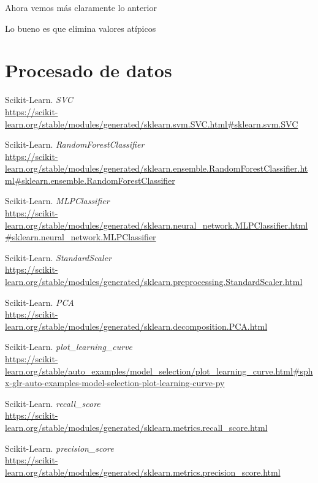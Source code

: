 \documentclass[11pt,a4paper]{article}
\begin{document}
Ahora vemos más claramente lo anterior

Lo bueno es que elimina valores atípicos


\section{Procesado de datos}




\newpage

\begin{thebibliography}{}
    
    Scikit-Learn. \textit{SVC}
    \\\url{https://scikit-learn.org/stable/modules/generated/sklearn.svm.SVC.html#sklearn.svm.SVC}
    
    Scikit-Learn. \textit{RandomForestClassifier}
    \\\url{https://scikit-learn.org/stable/modules/generated/sklearn.ensemble.RandomForestClassifier.html#sklearn.ensemble.RandomForestClassifier}
    
    Scikit-Learn. \textit{MLPClassifier}
    \\\url{https://scikit-learn.org/stable/modules/generated/sklearn.neural_network.MLPClassifier.html#sklearn.neural_network.MLPClassifier}
    
    Scikit-Learn. \textit{StandardScaler}
    \\\url{https://scikit-learn.org/stable/modules/generated/sklearn.preprocessing.StandardScaler.html}
    
    Scikit-Learn. \textit{PCA}
    \\\url{https://scikit-learn.org/stable/modules/generated/sklearn.decomposition.PCA.html}
    
    Scikit-Learn. \textit{plot\_learning\_curve}
    \\\url{https://scikit-learn.org/stable/auto_examples/model_selection/plot_learning_curve.html#sphx-glr-auto-examples-model-selection-plot-learning-curve-py}
    
    Scikit-Learn. \textit{recall\_score}
    \\\url{https://scikit-learn.org/stable/modules/generated/sklearn.metrics.recall_score.html}
    
    Scikit-Learn. \textit{precision\_score}
    \\\url{https://scikit-learn.org/stable/modules/generated/sklearn.metrics.precision_score.html}
    

\end{thebibliography}
\end{document}
